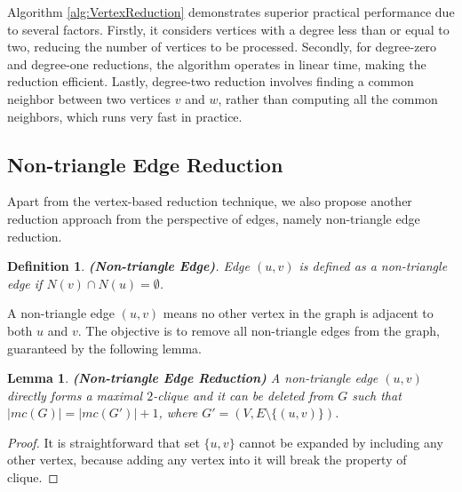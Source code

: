 \documentclass[sigconf, nonacm]{acmart}
\newtheorem{lem}[thm]{\bf Lemma}
\newtheorem{definition}{Definition}%
\begin{document}
Algorithm \ref{alg:VertexReduction} demonstrates superior practical performance due to several factors. Firstly, it considers vertices with a degree less than or equal to two,
reducing the number of vertices to be processed. Secondly, for degree-zero and degree-one reductions, the algorithm operates in linear time, making the reduction efficient. Lastly, 
degree-two reduction involves finding a common neighbor between two vertices $v$ and $w$, rather than computing all the common neighbors, which runs very fast in practice. 

  
\vspace{-0.05in}
\subsection{Non-triangle Edge Reduction}\label{subsec:non-triangle reduction}
\vspace{-0.05in}

Apart from the vertex-based reduction technique, we also propose another reduction approach from the perspective of edges, namely non-triangle edge reduction.

\begin{definition}
\textit{
    \textbf{(Non-triangle Edge)}.
    Edge $(u,v)$ is defined as a non-triangle edge if $N(v)\cap N(u) = \emptyset$. 
}
\end{definition}


A non-triangle edge $(u,v)$ means no other vertex in the graph is adjacent to both $u$ and $v$. The objective is to remove all non-triangle edges from the graph, guaranteed by the following lemma.

\begin{lem}{\textbf{(Non-triangle Edge Reduction)}}
\textit{
A non-triangle edge $(u,v)$ directly forms a maximal $2$-clique and it can be deleted from $G$ such that $\lvert mc(G)\rvert = \lvert mc(G')\rvert + 1$, where $G'=(V, E\setminus \{(u,v)\})$.  
}
\end{lem}
\begin{proof}
    It is straightforward that set $\{u,v\}$ cannot be expanded by including any other vertex, because adding any vertex into it will break the property of clique.
\end{proof}
\end{document}
